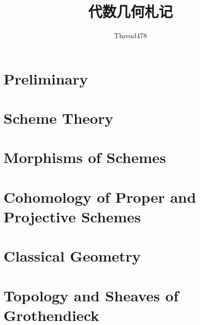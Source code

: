 \documentclass[12pt,fleqn,dvipsnames,svgnames]{book}
\title{代数几何札记}
\author{Thread478}
\begin{document}
\part{Preliminary}




\part{Scheme Theory}




\part{Morphisms of Schemes}




\part{Cohomology of Proper and Projective Schemes}




\part{Classical Geometry}




\part{Topology and Sheaves of Grothendieck}

\end{document}
